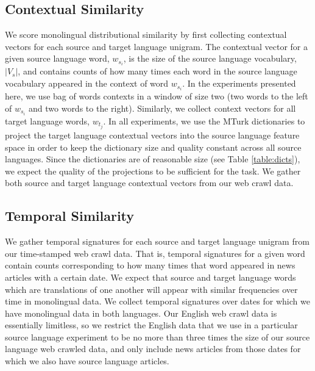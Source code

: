 \documentclass[11pt]{article}
\begin{document}
\subsection{Contextual Similarity} 
We score monolingual distributional similarity by first collecting contextual vectors for each source and target language unigram. The contextual vector for a given source language word, $w_{s_i}$, is the size of the source language vocabulary, $|V_s|$, and contains counts of how many times each word in the source language vocabulary appeared in the context of word $w_{s_i}$. In the experiments presented here, we use bag of words contexts in a window of size two (two words to the left of $w_{s_i}$ and two words to the right). Similarly, we collect context vectors for all target language words, $w_{t_j}$. In all experiments, we use the MTurk dictionaries to project the target language contextual vectors into the source language feature space in order to keep the dictionary size and quality constant across all source languages. Since the dictionaries are of reasonable size (see Table \ref{table:dicts}), we expect the quality of the projections to be sufficient for the task. We gather both source and target language contextual vectors from our web crawl data.

\subsection{Temporal Similarity}\label{ssec:temporal}
We gather temporal signatures for each source and target language unigram from our time-stamped web crawl data. That is, temporal signatures for a given word contain counts corresponding to how many times that word appeared in news articles with a certain date. We expect that source and target language words which are translations of one another will appear with similar frequencies over time in monolingual data. We collect temporal signatures over dates for which we have monolingual data in both languages. Our English web crawl data is essentially limitless, so we restrict the English data that we use in a particular source language experiment to be no more than three times the size of our source language web crawled data, and only include news articles from those dates for which we also have source language articles.
\end{document}
